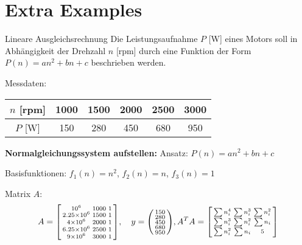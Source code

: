 \section{Extra Examples}


\begin{example2}{Lineare Ausgleichsrechnung}
Die Leistungsaufnahme $P$ [W] eines Motors soll in Abhängigkeit der Drehzahl $n$ [rpm] durch eine Funktion der Form $P(n) = an^2 + bn + c$ beschrieben werden.

Messdaten:
\begin{center}
\begin{tabular}{|c|c|c|c|c|c|}
\hline
$n$ [rpm] & 1000 & 1500 & 2000 & 2500 & 3000 \\
\hline
$P$ [W] & 150 & 280 & 450 & 680 & 950 \\
\hline
\end{tabular}
\end{center}

\textbf{Normalgleichungssystem aufstellen:}
Ansatz: $P(n) = an^2 + bn + c$

Basisfunktionen: $f_1(n) = n^2$, $f_2(n) = n$, $f_3(n) = 1$

Matrix $A$:
$$A = \begin{bsmallmatrix}
10^6 & 1000 & 1 \\
2.25 \times 10^6 & 1500 & 1 \\
4 \times 10^6 & 2000 & 1 \\
6.25 \times 10^6 & 2500 & 1 \\
9 \times 10^6 & 3000 & 1
\end{bsmallmatrix}, \quad y = \begin{psmallmatrix} 150 \\ 280 \\ 450 \\ 680 \\ 950 \end{psmallmatrix},
A^T A = \begin{bsmallmatrix}
\sum n_i^4 & \sum n_i^3 & \sum n_i^2 \\
\sum n_i^3 & \sum n_i^2 & \sum n_i \\
\sum n_i^2 & \sum n_i & 5
\end{bsmallmatrix}$$


\end{example2}
